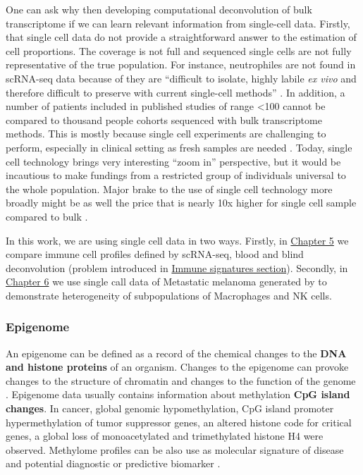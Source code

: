 \documentclass[12pt,]{book}
\theoremstyle{definition}
\theoremstyle{definition}
\theoremstyle{definition}
\theoremstyle{remark}
\begin{document}
One can ask why then developing computational deconvolution of bulk
transcriptome if we can learn relevant information from single-cell
data. Firstly, that single cell data do not provide a straightforward
answer to the estimation of cell proportions. The coverage is not full
and sequenced single cells are not fully representative of the true
population. For instance, neutrophiles are not found in scRNA-seq data
because of they are ``difficult to isolate, highly labile \emph{ex vivo}
and therefore difficult to preserve with current single-cell methods''
\citep{Schelker2017}. In addition, a number of patients included in
published studies of range \textless{}100 cannot be compared to thousand
people cohorts sequenced with bulk transcriptome methods. This is mostly
because single cell experiments are challenging to perform, especially
in clinical setting as fresh samples are needed \citep{Schelker2017}.
Today, single cell technology brings very interesting ``zoom in''
perspective, but it would be incautious to make fundings from a
restricted group of individuals universal to the whole population. Major
brake to the use of single cell technology more broadly might be as well
the price that is nearly 10x higher for single cell sample compared to
bulk \citep{Cedar2018}.

In this work, we are using single cell data in two ways. Firstly, in
\protect\hyperlink{results}{Chapter 5} we compare immune cell profiles
defined by scRNA-seq, blood and blind deconvolution (problem introduced
in \protect\hyperlink{immune-signatures}{Immune signatures section}).
Secondly, in \protect\hyperlink{map}{Chapter 6} we use single call data
of Metastatic melanoma generated by \citet{Tirosh2016} to demonstrate
heterogeneity of subpopulations of Macrophages and NK cells.

\hypertarget{epi}{%
\subsubsection{Epigenome}\label{epi}}

An epigenome can be defined as a record of the chemical changes to the
\textbf{DNA and histone proteins} of an organism. Changes to the
epigenome can provoke changes to the structure of chromatin and changes
to the function of the genome \citep{Bernstein2007}. Epigenome data
usually contains information about methylation \textbf{CpG island
changes}. In cancer, global genomic hypomethylation, CpG island promoter
hypermethylation of tumor suppressor genes, an altered histone code for
critical genes, a global loss of monoacetylated and trimethylated
histone H4 were observed. Methylome profiles can be also use as
molecular signature of disease and potential diagnostic or predictive
biomarker \citep{Jeschke2017}.
\end{document}
